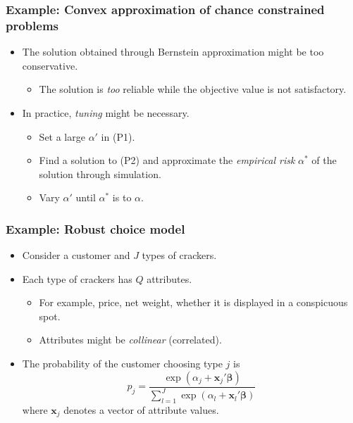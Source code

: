 \documentclass{beamer}
\begin{document}
\begin{frame}
	\frametitle{Example: Convex approximation of chance constrained problems}
	\begin{itemize}
		\item The solution obtained through Bernstein approximation might be too conservative.
		\begin{itemize}
			\item The solution is \textit{too} reliable while the objective value is not satisfactory.
		\end{itemize}
		\item In practice, \textit{tuning} might be necessary.
		\begin{itemize}
			\item Set a large $\alpha'$ in (P1). 
			\item Find a solution to (P2) and approximate the \textit{empirical risk} $\alpha^*$ of the solution through simulation.
			\item Vary $\alpha'$ until $\alpha^*$ is  to $\alpha$.
		\end{itemize}
	\end{itemize}
\end{frame}

\begin{frame}
	\frametitle{Example: Robust choice model}
	\begin{itemize}
		\item Consider a customer and $J$ types of crackers.
		\item Each type of crackers has $Q$ attributes.
		\begin{itemize}
			\item For example, price, net weight, whether it is displayed in a conspicuous spot.
			\item Attributes might be \textit{collinear} (correlated).
		\end{itemize}
		\item The probability of the customer choosing type $j$ is
		\[ p_j = \dfrac{\exp\left(\alpha_j + \boldsymbol{x}_j' \boldsymbol{\beta} \right)}{ \sum_{l=1}^J \exp\left(\alpha_l + \boldsymbol{x}_l' \boldsymbol{\beta} \right) } \]
		where $\boldsymbol{x}_j$ denotes a vector of attribute values.
	\end{itemize}
\end{frame}
\end{document}
